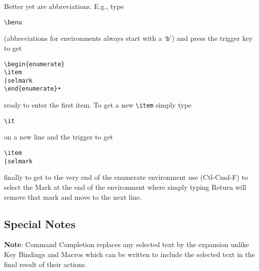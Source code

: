 \documentclass[11pt]{article}
\newcommand{\cmd}[1]{\textsf{#1}}
\begin{document}
Better yet are abbreviations. E.g., type
\begin{verbatim}
\benu
\end{verbatim}
(abbreviations for environments always start with a `\texttt{b}') and press the trigger key to get
\begin{verbatim}
\begin{enumerate}
\item
|selmark
\end{enumerate}•
\end{verbatim}
ready to enter the first item. To get a new \verb"\item" simply type
\begin{verbatim}
\it
\end{verbatim}
on a new line and the trigger to get
\begin{verbatim}
\item
|selmark
\end{verbatim}
finally to get to the very end of the enumerate environment use (\cmd{Ctl-Cmd-F}) to select the \cmd{Mark} at the end of the environment where simply typing \cmd{Return} will remove that mark and move to the next line.

\subsection{Special Notes}

\textbf{Note}: \cmd{Command Completion} replaces any selected text by the expansion unlike \cmd{Key Bindings} and \cmd{Macros} which can be written to include the selected text in the final result of their actions.
\end{document}

